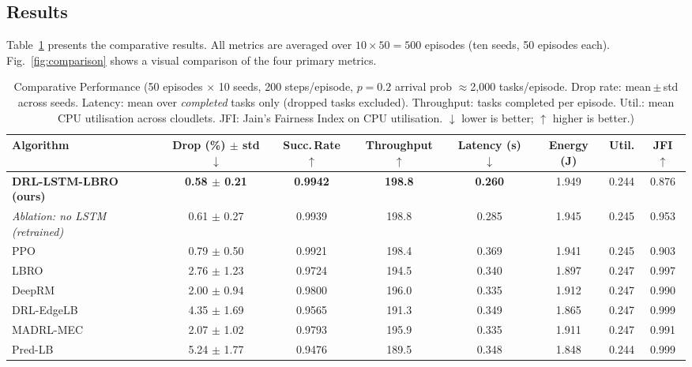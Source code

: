\documentclass[conference]{IEEEtran}
\begin{document}
\subsection{Results}

Table~\ref{tab:results} presents the comparative results. All metrics
are averaged over $10\times50 = 500$ episodes (ten seeds, 50 episodes
each). Fig.~\ref{fig:comparison} shows a visual comparison of the four
primary metrics.

\begin{table}[htbp]
\centering
\caption{Comparative Performance (50 episodes $\times$ 10 seeds, 200 steps/episode,
  $p{=}0.2$ arrival prob $\approx$2{,}000 tasks/episode.
  Drop rate: mean\,$\pm$\,std across seeds.
  Latency: mean over \emph{completed} tasks only (dropped tasks excluded).
  Throughput: tasks completed per episode.
  Util.: mean CPU utilisation across cloudlets.
  JFI: Jain's Fairness Index on CPU utilisation.
  $\downarrow$ lower is better; $\uparrow$ higher is better.)}
\label{tab:results}
\begin{tabular}{lccccccc}
\toprule
\textbf{Algorithm} &
\textbf{Drop (\%) $\pm$ std} $\downarrow$ &
\textbf{Succ.\,Rate} $\uparrow$ &
\textbf{Throughput} $\uparrow$ &
\textbf{Latency (s)} $\downarrow$ &
\textbf{Energy (J)} &
\textbf{Util.} &
\textbf{JFI} $\uparrow$ \\
\midrule
\textbf{DRL-LSTM-LBRO (ours)} & \textbf{0.58 $\pm$ 0.21} & \textbf{0.9942} & \textbf{198.8} & \textbf{0.260} & 1.949 & 0.244 & 0.876 \\
\textit{Ablation: no LSTM (retrained)} & 0.61 $\pm$ 0.27 & 0.9939 & 198.8 & 0.285 & 1.945 & 0.245 & 0.953 \\
PPO~\cite{schulman2017ppo}        & 0.79 $\pm$ 0.50 & 0.9921 & 198.4 & 0.369 & 1.941 & 0.245 & 0.903 \\
\midrule
LBRO~\cite{nayyer2022lbro}        & 2.76 $\pm$ 1.23 & 0.9724 & 194.5 & 0.340 & 1.897 & 0.247 & 0.997 \\
DeepRM~\cite{mao2016resource}     & 2.00 $\pm$ 0.94 & 0.9800 & 196.0 & 0.335 & 1.912 & 0.247 & 0.990 \\
DRL-EdgeLB~\cite{liu2022edgelb}   & 4.35 $\pm$ 1.69 & 0.9565 & 191.3 & 0.349 & 1.865 & 0.247 & 0.999 \\
MADRL-MEC~\cite{zhao2022madrl}    & 2.07 $\pm$ 1.02 & 0.9793 & 195.9 & 0.335 & 1.911 & 0.247 & 0.991 \\
Pred-LB~\cite{predlb2025}         & 5.24 $\pm$ 1.77 & 0.9476 & 189.5 & 0.348 & 1.848 & 0.244 & 0.999 \\
\bottomrule
\end{tabular}
\end{table}
\end{document}
